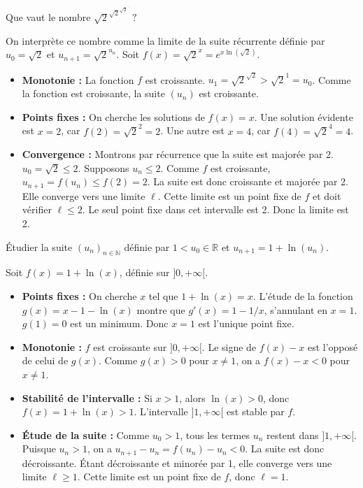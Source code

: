 \documentclass[solutions]{exercices}
\begin{document}
\begin{exercice}
Que vaut le nombre $\sqrt{2}^{\sqrt{2}^{\sqrt{2}^{\,\cdot^{\,\cdot^{\,\cdot}}}}}  ?$
\end{exercice}

\begin{solution}
On interprète ce nombre comme la limite de la suite récurrente définie par $u_0 = \sqrt{2}$ et $u_{n+1} = \sqrt{2}^{u_n}$.
Soit $f(x) = \sqrt{2}^x = e^{x\ln(\sqrt{2})}$.
\begin{itemize}
    \item \textbf{Monotonie :} La fonction $f$ est croissante. $u_1 = \sqrt{2}^{\sqrt{2}} > \sqrt{2}^{1} = u_0$. Comme la fonction est croissante, la suite $(u_n)$ est croissante.
    \item \textbf{Points fixes :} On cherche les solutions de $f(x)=x$. Une solution évidente est $x=2$, car $f(2)=\sqrt{2}^2=2$. Une autre est $x=4$, car $f(4)=\sqrt{2}^4 = 4$.
    \item \textbf{Convergence :} Montrons par récurrence que la suite est majorée par 2.
    $u_0 = \sqrt{2} \le 2$.
    Supposons $u_n \le 2$. Comme $f$ est croissante, $u_{n+1} = f(u_n) \le f(2) = 2$.
    La suite est donc croissante et majorée par 2. Elle converge vers une limite $\ell$.
    Cette limite est un point fixe de $f$ et doit vérifier $\ell \le 2$.
    Le seul point fixe dans cet intervalle est 2.
    Donc la limite est 2.
\end{itemize}
\end{solution}

\begin{exercice}
\'Etudier la suite $(u_n)_{n \in \mathbb{N}}$ définie par $1<u_0\in\mathbb{R}$ et $u_{n+1}=1+\ln(u_n)$.
\end{exercice}

\begin{solution}
Soit $f(x)=1+\ln(x)$, définie sur $]0, +\infty[$.
\begin{itemize}
    \item \textbf{Points fixes :} On cherche $x$ tel que $1+\ln(x)=x$. L'étude de la fonction $g(x)=x-1-\ln(x)$ montre que $g'(x)=1-1/x$, s'annulant en $x=1$. $g(1)=0$ est un minimum. Donc $x=1$ est l'unique point fixe.
    \item \textbf{Monotonie :} $f$ est croissante sur $]0, +\infty[$. Le signe de $f(x)-x$ est l'opposé de celui de $g(x)$. Comme $g(x)>0$ pour $x \ne 1$, on a $f(x)-x < 0$ pour $x \ne 1$.
    \item \textbf{Stabilité de l'intervalle :} Si $x>1$, alors $\ln(x)>0$, donc $f(x)=1+\ln(x)>1$. L'intervalle $]1, +\infty[$ est stable par $f$.
    \item \textbf{Étude de la suite :} Comme $u_0 > 1$, tous les termes $u_n$ restent dans $]1, +\infty[$.
    Puisque $u_n > 1$, on a $u_{n+1}-u_n = f(u_n)-u_n < 0$. La suite est donc décroissante.
    Étant décroissante et minorée par 1, elle converge vers une limite $\ell \ge 1$.
    Cette limite est un point fixe de $f$, donc $\ell=1$.
\end{itemize}
\end{solution}
\end{document}
